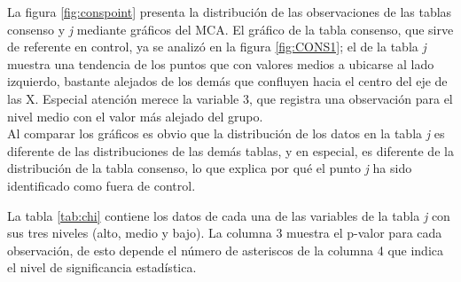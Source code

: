 \documentclass[water,article,submit,moreauthors,pdftex]{mdpi}
\begin{document}
La figura \ref{fig:conspoint} presenta la distribución de las
observaciones de las tablas consenso y \emph{j} mediante gráficos del
MCA. El gráfico de la tabla consenso, que sirve de referente en control,
ya se analizó en la figura \ref{fig:CONS1}; el de la tabla \emph{j}
muestra una tendencia de los puntos que con valores medios a ubicarse al
lado izquierdo, bastante alejados de los demás que confluyen hacia el
centro del eje de las X. Especial atención merece la variable 3, que
registra una observación para el nivel medio con el valor más alejado
del grupo.\\
Al comparar los gráficos es obvio que la distribución de los datos en la
tabla \emph{j} es diferente de las distribuciones de las demás tablas, y
en especial, es diferente de la distribución de la tabla consenso, lo
que explica por qué el punto \emph{j} ha sido identificado como fuera de
control.

La tabla \ref{tab:chi} contiene los datos de cada una de las variables
de la tabla \emph{j} con sus tres niveles (alto, medio y bajo). La
columna 3 muestra el p-valor para cada observación, de esto depende el
número de asteriscos de la columna 4 que indica el nivel de
significancia estadística.
\end{document}
